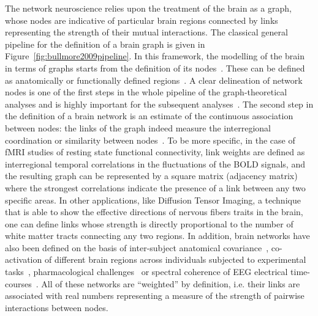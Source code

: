 The network neuroscience relies upon the treatment of the brain as a graph, whose nodes are indicative of particular brain regions connected by links representing  the strength of their mutual interactions.
The classical general pipeline for the definition of a brain graph is given in Figure~\ref{fig:bullmore2009pipeline}.
In this framework, the modelling of the brain in terms of graphs starts from the definition of its nodes~\cite{stanley2013}.
These can be defined as anatomically or functionally defined regions~\cite{vandenheuvel2010}.
A clear delineation of network nodes is one of the first steps in the whole pipeline of the graph-theoretical analyses and is highly important for the subsequent analyses~\cite{stanley2013}.
The second step in the definition of a brain network is an estimate of the continuous association between nodes: the links of the graph indeed measure the interregional coordination or similarity between nodes~\cite{pereda2005a}.
To be more specific, in the case of fMRI studies of resting state functional connectivity, link weights are defined as interregional temporal correlations in the fluctuations of the BOLD signals, and the resulting graph can be represented by a square matrix (adjacency matrix) where the strongest correlations indicate the presence of a link between any two specific areas.
In other applications, like Diffusion Tensor Imaging, a technique that is able to show the effective directions of nervous fibers traits in the brain, one can define links whose strength is directly proportional to the number of white matter tracts connecting any two regions.
In addition, brain networks have also been defined on the basis of inter-subject anatomical covariance~\cite{evans2013,he2007}, co-activation of different brain regions across individuals subjected to experimental tasks~\cite{crossley2013a}, pharmacological challenges~\cite{schwarz2007,schwarz2008} or spectral coherence of EEG electrical time-courses~\cite{pereda2005a}.
All of these networks are ``weighted'' by definition, i.e. their links are associated with real numbers representing a measure of the strength of pairwise interactions between nodes.

